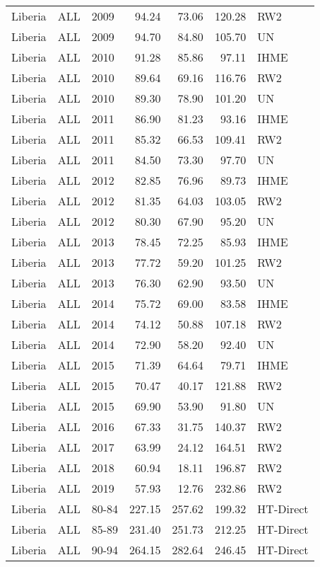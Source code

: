 \begin{longtable}{lllrrrl}
  Liberia & ALL & 2009 & 94.24 & 73.06 & 120.28 & RW2 \\ 
  Liberia & ALL & 2009 & 94.70 & 84.80 & 105.70 & UN \\ 
  Liberia & ALL & 2010 & 91.28 & 85.86 & 97.11 & IHME \\ 
  Liberia & ALL & 2010 & 89.64 & 69.16 & 116.76 & RW2 \\ 
  Liberia & ALL & 2010 & 89.30 & 78.90 & 101.20 & UN \\ 
  Liberia & ALL & 2011 & 86.90 & 81.23 & 93.16 & IHME \\ 
  Liberia & ALL & 2011 & 85.32 & 66.53 & 109.41 & RW2 \\ 
  Liberia & ALL & 2011 & 84.50 & 73.30 & 97.70 & UN \\ 
  Liberia & ALL & 2012 & 82.85 & 76.96 & 89.73 & IHME \\ 
  Liberia & ALL & 2012 & 81.35 & 64.03 & 103.05 & RW2 \\ 
  Liberia & ALL & 2012 & 80.30 & 67.90 & 95.20 & UN \\ 
  Liberia & ALL & 2013 & 78.45 & 72.25 & 85.93 & IHME \\ 
  Liberia & ALL & 2013 & 77.72 & 59.20 & 101.25 & RW2 \\ 
  Liberia & ALL & 2013 & 76.30 & 62.90 & 93.50 & UN \\ 
  Liberia & ALL & 2014 & 75.72 & 69.00 & 83.58 & IHME \\ 
  Liberia & ALL & 2014 & 74.12 & 50.88 & 107.18 & RW2 \\ 
  Liberia & ALL & 2014 & 72.90 & 58.20 & 92.40 & UN \\ 
  Liberia & ALL & 2015 & 71.39 & 64.64 & 79.71 & IHME \\ 
  Liberia & ALL & 2015 & 70.47 & 40.17 & 121.88 & RW2 \\ 
  Liberia & ALL & 2015 & 69.90 & 53.90 & 91.80 & UN \\ 
  Liberia & ALL & 2016 & 67.33 & 31.75 & 140.37 & RW2 \\ 
  Liberia & ALL & 2017 & 63.99 & 24.12 & 164.51 & RW2 \\ 
  Liberia & ALL & 2018 & 60.94 & 18.11 & 196.87 & RW2 \\ 
  Liberia & ALL & 2019 & 57.93 & 12.76 & 232.86 & RW2 \\ 
  Liberia & ALL & 80-84 & 227.15 & 257.62 & 199.32 & HT-Direct \\ 
  Liberia & ALL & 85-89 & 231.40 & 251.73 & 212.25 & HT-Direct \\ 
  Liberia & ALL & 90-94 & 264.15 & 282.64 & 246.45 & HT-Direct \\ 

\end{longtable}
